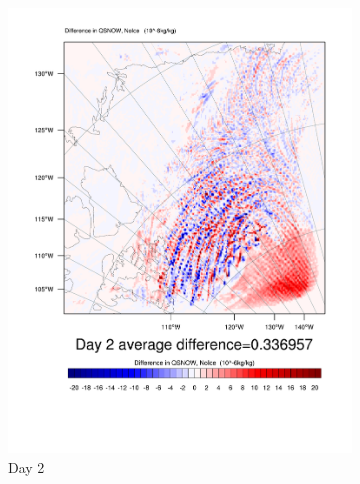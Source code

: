 \begin{figure}
\begin{subfigure}{0.32\textwidth}
		\includegraphics[width=\textwidth]{results/noice/diff_NoIce_qsnow_Day2.pdf}
		\caption{Day 2}
		\label{subfig:snowstory_Day2}
	\end{subfigure}
	\begin{subfigure}{0.32\textwidth}
		\centering

\end{subfigure}
\end{figure}
